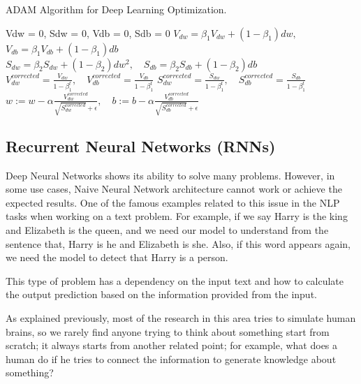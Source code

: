 \begin{algorithm}
\caption{ADAM Algorithm for Deep Learning Optimization.}\label{Alg:Adam}
\begin{algorithmic}
  \State Vdw = 0, Sdw = 0, Vdb = 0, Sdb = 0
   
  \State $V_{dw} = \beta_1 V_{dw} + (1-\beta_1) dw,$\quad$ V_{db} = \beta_1 V_{db} + (1-\beta_1) db$ 
  \State $S_{dw} = \beta_2 S_{dw} + (1-\beta_2) dw^2,\quad S_{db} = \beta_2 S_{db} + (1-\beta_2) db$ 
  \State $V_{dw}^{corrected} = \frac{V_{dw}}{1-\beta_1^t} ,\quad V_{db}^{corrected} = \frac{V_{db}}{1-\beta_1^t} $
  \State $S_{dw}^{corrected} = \frac{S_{dw}}{1-\beta_1^t} ,\quad S_{db}^{corrected} = \frac{S_{db}}{1-\beta_1^t} $
  \State $w:= w-\alpha \frac{V_{dw}^{corrected}}{\sqrt{S_{dw}^{corrected}} + \epsilon},\quad b:= b-\alpha \frac{V_{db}^{corrected}}{\sqrt{S_{db}^{corrected}} + \epsilon}$
  \EndFor
\end{algorithmic}
\end{algorithm}

\subsection{Recurrent Neural Networks (RNNs)}\label{Sec:RNN}

Deep Neural Networks shows its ability to solve many problems. However, in some use cases, Naive Neural Network architecture cannot work or achieve the expected results. One of the famous examples related to this issue in the NLP tasks when working on a text problem. For example, if we say Harry is the king and Elizabeth is the queen, and we need our model to understand from the sentence that, Harry is he and Elizabeth is she. Also, if this word appears again, we need the model to detect that Harry is a person.

This type of problem has a dependency on the input text and how to calculate the output prediction based on the information  provided from the input.

As explained previously, most of the research in this area tries to simulate human brains, so we rarely find anyone trying to think about something start from scratch; it always starts from another related point; for example, what does a human do if he tries to connect the information to generate knowledge about something?

